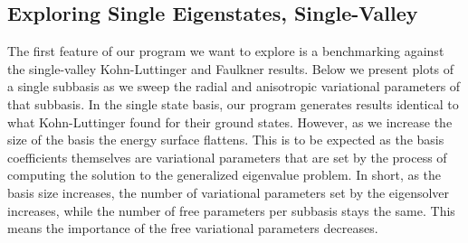 







\subsection{Exploring Single Eigenstates, Single-Valley}

The first feature of our program we want to explore is a benchmarking against
the single-valley Kohn-Luttinger and Faulkner results. Below we present plots of
a single subbasis as we sweep the radial and anisotropic variational parameters
of that subbasis. In the single state basis, our program generates results
identical to what Kohn-Luttinger found for their ground states. However, as we
increase the size of the basis the energy surface flattens. This is to be
expected as the basis coefficients themselves are variational parameters that
are set by the process of computing the solution to the generalized eigenvalue
problem. In short, as the basis size increases, the number of variational
parameters set by the eigensolver increases, while the number of free parameters
per subbasis stays the same. This means the importance of the free variational
parameters decreases.

